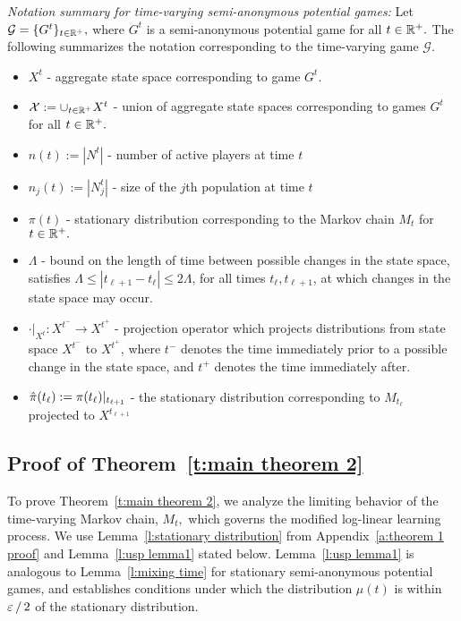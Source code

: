 \noindent\emph{Notation summary for time-varying semi-anonymous potential games:}  Let $\mathcal{G} = \{G^t\}_{t\in \mathbb{R}^+},$ where $G^t$ is a semi-anonymous potential game for all $t\in \mathbb{R}^+.$ The following summarizes the notation corresponding to the time-varying game $\mathcal{G}.$
\begin{itemize}
\item $X^t$ - aggregate state space corresponding to game $G^t.$
\item ${\mathcal X}:= \cup_{t\in \mathbb{R}^+} X^t$ - union of aggregate state spaces corresponding to games $G^t$ for all $t\in \mathbb{R}^+.$
\item $n(t) := |N^t|$ - number of active players at time $t$
\item $n_j(t) := |N_j^t|$ - size of the $j$th population at time $t$
\item $\pi(t)$ - stationary distribution corresponding to the Markov chain $M_t$ for $t\in\mathbb{R}^+.$
\item $\Lambda$ - bound on the length of time between possible changes in the state space, satisfies $\Lambda \leq |t_{\ell +1} - t_{\ell}|\leq 2\Lambda$, for all times $t_{\ell},t_{\ell+1}$, at which changes in the state space may occur.
\item $\cdot |_{X^t} : X^{t^-}\to X^{t^+}$ - projection operator which projects distributions from state space $X^{t^-}$ to $X^{t^+}$, where $t^-$ denotes the time immediately prior to a possible change in the state space, and $t^+$ denotes the time immediately after.
\item $\hat{\pi}(t_{{\ell}}):=\pi(t_{{\ell}})|_{t_{{\ell}+1}}$ - the stationary distribution corresponding to $M_{t_\ell}$ projected to $X^{t_{\ell +1}}$
\end{itemize}



\subsection{Proof of Theorem~\ref{t:main theorem 2}}\label{a:theorem 2 proof}

To prove Theorem~\ref{t:main theorem 2}, we analyze the limiting behavior of the time-varying Markov chain, $M_t,$ which governs the modified log-linear learning process. We use Lemma~\ref{l:stationary distribution} from Appendix~\ref{a:theorem 1 proof} and Lemma~\ref{l:usp lemma1} stated below.  
Lemma~\ref{l:usp lemma1} is analogous to Lemma~\ref{l:mixing time} for stationary semi-anonymous potential games, and establishes conditions under which the distribution $\mu(t)$ is within $\varepsilon\mathop{/}2$ of the stationary distribution. 

